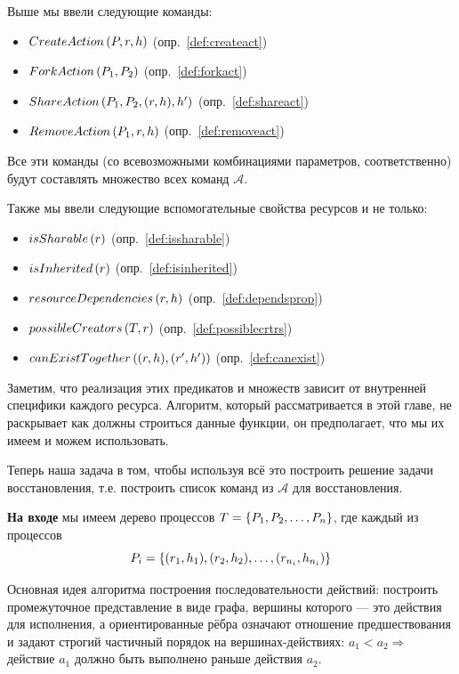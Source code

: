 Выше мы ввели следующие команды:

\begin{itemize}
	\item $CreateAction\left( P, r, h \right)$ (опр.~\ref{def:createact})
	\item $ForkAction\left( P_1, P_2 \right)$ (опр.~\ref{def:forkact})
	\item $ShareAction\left( P_1, P_2, (r, h), h' \right)$ (опр.~\ref{def:shareact})
	\item $RemoveAction\left( P_1, r, h \right)$ (опр.~\ref{def:removeact})
\end{itemize}

Все эти команды (со всевозможными комбинациями параметров, соответственно) будут составлять множество всех команд $\mathcal{A}$.

Также мы ввели следующие вспомогательные свойства ресурсов и не только:

\begin{itemize}
	\item $isSharable\left( r \right)$ (опр.~\ref{def:issharable})
	\item $isInherited\left( r \right)$ (опр.~\ref{def:isinherited})
	\item $resourceDependencies\left( r, h \right)$ (опр.~\ref{def:dependsprop})
	\item $possibleCreators\left( T, r \right)$ (опр.~\ref{def:possiblecrtrs})
	\item $canExistTogether\left( (r, h), (r', h') \right)$ (опр.~\ref{def:canexist})
\end{itemize}

Заметим, что реализация этих предикатов и множеств зависит от внутренней специфики каждого ресурса. Алгоритм, который рассматривается в этой главе, не раскрывает как должны строиться данные функции, он предполагает, что мы их имеем и можем использовать.

Теперь наша задача в том, чтобы используя всё это построить решение задачи восстановления, т.е. построить список команд из $\mathcal{A}$ для восстановления.

\textbf{На входе} мы имеем дерево процессов $T = \left\lbrace P_1, P_2, \ldots, P_n \right\rbrace$, где каждый из процессов 
\begin{equation*}
P_i = \left\lbrace (r_1, h_1), (r_2, h_2), \ldots, (r_{n_i}, h_{n_i}) \right\rbrace
\end{equation*}

Основная идея алгоритма построения последовательности действий: построить промежуточное представление в виде графа, вершины которого --- это действия для исполнения, а ориентированные рёбра означают отношение предшествования и задают строгий частичный порядок на вершинах-действиях: $a_1 < a_2 \Longrightarrow $ действие $a_1$ должно быть выполнено раньше действия $a_2$.

